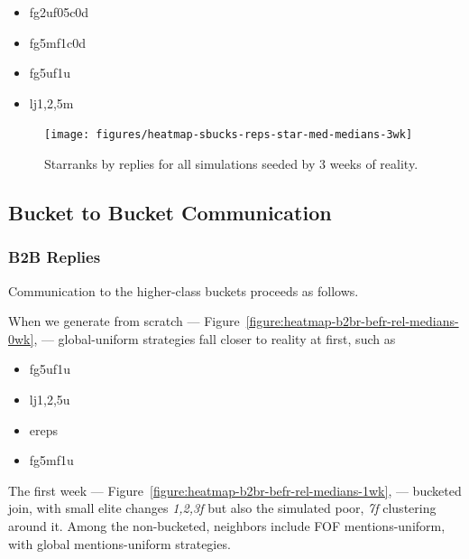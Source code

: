 \documentclass[10pt,oneside]{memoir}
\begin{document}
\begin{Spacing}{2}
\begin{itemize}
\item fg2uf05c0d

\item fg5mf1c0d

\item fg5uf1u

\item lj{1,2,5}m
\end{itemize}


\begin{figure}
\begin{center}
    \texttt{[image: figures/heatmap-sbucks-reps-star-med-medians-3wk]}
    \caption{Starranks by replies for all simulations seeded by 3 weeks of reality.}
    \label{figure:heatmap-sbucks-reps-star-med-medians-3wk}
\end{center}
\end{figure}
\pagebreak \subsection{Bucket to Bucket Communication}
\label{buckettobucketcommunication}

\subsubsection{B2B Replies}
\label{b2breplies}

Communication to the higher-class buckets proceeds as follows.


When we generate from scratch --- Figure~\ref{figure:heatmap-b2br-befr-rel-medians-0wk}, --- global-uniform strategies fall closer to reality at first, such as


\begin{itemize}


\item fg5uf1u

\item lj{1,2,5}u

\item ereps

\item fg5mf1u
\end{itemize}

The first week --- Figure~\ref{figure:heatmap-b2br-befr-rel-medians-1wk}, ---  bucketed join, with small elite changes {\itshape {1,2,3}f} but also the simulated poor, {\itshape 7f} clustering around it.  Among the non-bucketed, neighbors include FOF mentions-uniform, with global mentions-uniform strategies.



\end{Spacing}
\end{document}
